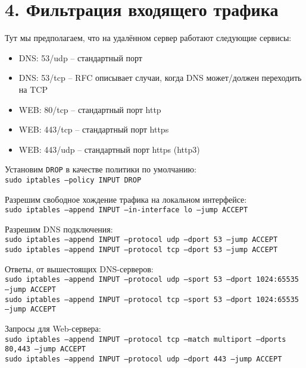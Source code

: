 \section*{4. Фильтрация входящего трафика}

Тут мы предполагаем, что на удалённом сервер работают следующие сервисы:
\begin{itemize}
    \item DNS: 53/udp -- стандартный порт
    \item DNS: 53/tcp -- RFC описывает случаи, когда DNS может/должен переходить на TCP
    \item WEB: 80/tcp -- стандартный порт http
    \item WEB: 443/tcp -- стандартный порт https
    \item WEB: 443/udp -- стандартный порт https (http3)
\end{itemize}

Установим \texttt{DROP} в качестве политики по умолчанию:\\
\texttt{sudo iptables --policy INPUT DROP}

Разрешим свободное хождение трафика на локальном интерфейсе:\\
\texttt{sudo iptables --append INPUT --in-interface lo --jump ACCEPT}

Разрешим DNS подключения:\\
\texttt{sudo iptables --append INPUT --protocol udp --dport 53 --jump ACCEPT}\\
\texttt{sudo iptables --append INPUT --protocol tcp --dport 53 --jump ACCEPT}

Ответы, от вышестоящих DNS-серверов:\\
\texttt{sudo iptables --append INPUT --protocol udp --sport 53 --dport 1024:65535 --jump ACCEPT}\\
\texttt{sudo iptables --append INPUT --protocol tcp --sport 53 --dport 1024:65535 --jump ACCEPT}

Запросы для Web-сервера:\\
\texttt{sudo iptables --append INPUT --protocol tcp --match multiport --dports 80,443 --jump ACCEPT}\\
\texttt{sudo iptables --append INPUT --protocol udp --dport 443 --jump ACCEPT}


